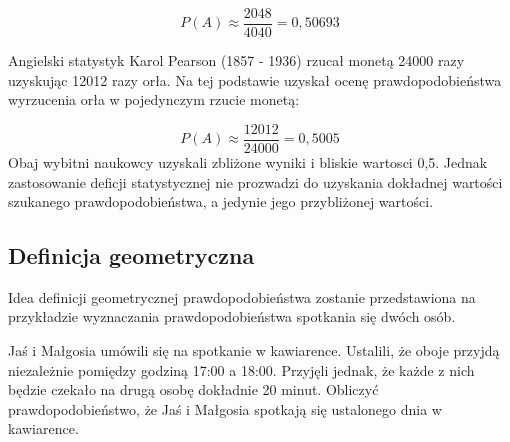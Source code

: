 \documentclass[
  letterpaper,
  DIV=11,
  numbers=noendperiod]{scrreprt}
\begin{document}
\[ P(A) \approx \frac{2048}{4040}=0,50693\]

Angielski statystyk Karol Pearson (1857 - 1936) rzucał monetą 24000 razy
uzyskując 12012 razy orła. Na tej podstawie uzyskał ocenę
prawdopodobieństwa wyrzucenia orła w pojedynczym rzucie monetą:

\[ P(A) \approx \frac{12012}{24000}=0,5005\] Obaj wybitni naukowcy
uzyskali zbliżone wyniki i bliskie wartosci 0,5. Jednak zastosowanie
deficji statystycznej nie prozwadzi do uzyskania dokładnej wartości
szukanego prawdopodobieństwa, a jedynie jego przybliżonej wartości.

\subsection{Definicja geometryczna}\label{definicja-geometryczna}

Idea definicji geometrycznej prawdopodobieństwa zostanie przedstawiona
na przykładzie wyznaczania prawdopodobieństwa spotkania się dwóch osób.

\begin{tcolorbox}[enhanced jigsaw, toprule=.15mm, title=\textcolor{quarto-callout-tip-color}{\faLightbulb}\hspace{0.5em}{Przykład 3.7. Spotkanie dwóch osób}, breakable, coltitle=black, titlerule=0mm, colbacktitle=quarto-callout-tip-color!10!white, opacitybacktitle=0.6, opacityback=0, bottomtitle=1mm, left=2mm, arc=.35mm, leftrule=.75mm, bottomrule=.15mm, rightrule=.15mm, toptitle=1mm, colframe=quarto-callout-tip-color-frame, colback=white]

\end{tcolorbox}

Jaś i Małgosia umówili się na spotkanie w kawiarence. Ustalili, że oboje
przyjdą niezależnie pomiędzy godziną 17:00 a 18:00. Przyjęli jednak, że
każde z nich będzie czekało na drugą osobę dokładnie 20 minut. Obliczyć
prawdopodobieństwo, że Jaś i Małgosia spotkają się ustalonego dnia w
kawiarence.

\begin{tcolorbox}[enhanced jigsaw, toprule=.15mm, title={Rozwiązanie}, breakable, coltitle=black, titlerule=0mm, colbacktitle=quarto-callout-tip-color!10!white, opacitybacktitle=0.6, opacityback=0, bottomtitle=1mm, left=2mm, arc=.35mm, leftrule=.75mm, bottomrule=.15mm, rightrule=.15mm, toptitle=1mm, colframe=quarto-callout-tip-color-frame, colback=white]

\end{tcolorbox}
\end{document}
